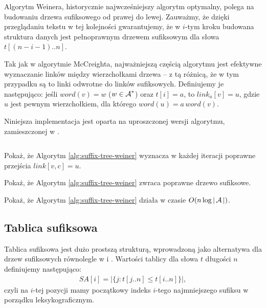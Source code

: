 Algorytm Weinera, historycznie najwcześniejszy algorytm optymalny, polega na budowaniu drzewa sufiksowego od prawej do lewej. Zauważmy, że dzięki przeglądaniu tekstu w tej kolejności gwarantujemy, że w $i$-tym kroku budowana struktura danych jest pełnoprawnym drzewem sufiksowym dla słowa $t[(n - i - 1)..n]$.

Tak jak w algorytmie McCreighta, najważniejszą częścią algorytmu jest efektywne wyznaczanie linków między wierzchołkami drzewa -- z tą różnicą, że w tym przypadku są to linki odwrotne do linków sufiksowych.
Definiujemy je następująco: jeśli $word(v) = w$ ($w \in \operatorname{\mathcal{A}}^*$) oraz $t[i] = a$, to $link_a[v] = u$, gdzie $u$ jest pewnym wierzchołkiem, dla którego $word(u) = a \, word(v)$.

Niniejsza implementacja jest oparta na uproszczonej wersji algorytmu, zamieszczonej w \citet{breslauer2013near}.
\begin{code}
\inputminted{python}{code/suffix-tree/weiner.py}
\label{alg:suffix-tree-weiner}
\end{code}

\begin{problem}{}{}
  Pokaż, że Algorytm \ref{alg:suffix-tree-weiner} wyznacza w każdej iteracji poprawne przejścia $link[v, c] = u$.
\end{problem}

\begin{problem}{}{}
  Pokaż, że Algorytm \ref{alg:suffix-tree-weiner} zwraca poprawne drzewo sufiksowe.
\end{problem}

\begin{problem}{}{}
  Pokaż, że Algorytm \ref{alg:suffix-tree-weiner} działa w czasie $O(n \log{|\operatorname{\mathcal{A}}|})$.
\end{problem}

\subsection{Tablica sufiksowa}

Tablica sufiksowa jest dużo prostszą strukturą, wprowadzoną jako alternatywa dla drzew sufiksowych równolegle w \citep{gonnet1992new} i \citep{manber1993suffix}.
Wartości tablicy dla słowa $t$ długości $n$ definiujemy następująco:
\begin{align*}
    SA[i] = |\{j: t[j..n] \le t[i..n]\}|,
\end{align*}
czyli na $i$-tej pozycji mamy początkowy indeks $i$-tego najmniejszego sufiksu w porządku leksykograficznym.

